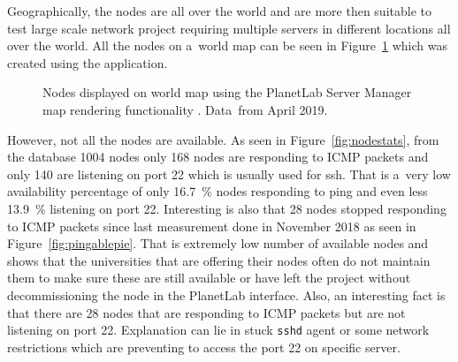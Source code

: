 {{{{{{{Geographically, the nodes are all over the world and are more then suitable to test large scale network project requiring multiple servers in different locations all over the world. All the nodes on a~world map can be seen in Figure~\ref{fig:allnodes} which was created using the application.

\begin{figure}[H]
	\centering
	\caption{Nodes displayed on world map using the PlanetLab Server Manager map rendering functionality \cite{OpenStreetMap}. Data~from April 2019.}
	\label{fig:allnodes}
\end{figure}

However, not all the nodes are available. As seen in Figure~\ref{fig:nodestats}, from the database 1004 nodes only 168 nodes are responding to ICMP packets and only 140 are listening on port 22 which is usually used for ssh. That is a~very low availability percentage of only \SI{16.7}{\percent} nodes responding to ping and even less \SI{13.9}{\percent} listening on port 22. Interesting is also that 28 nodes stopped responding to ICMP packets since last measurement done in November 2018 as seen in Figure~\ref{fig:pingablepie}. That is extremely low number of available nodes and shows that the universities that are offering their nodes often do not maintain them to make sure these are still available or have left the project without decommissioning the node in the PlanetLab interface. Also, an interesting fact is that there are 28 nodes that are responding to ICMP packets but are not listening on port 22. Explanation can lie in stuck \texttt{sshd} agent or some network restrictions which are preventing to access the port 22 on specific server.

}}}}}}}
